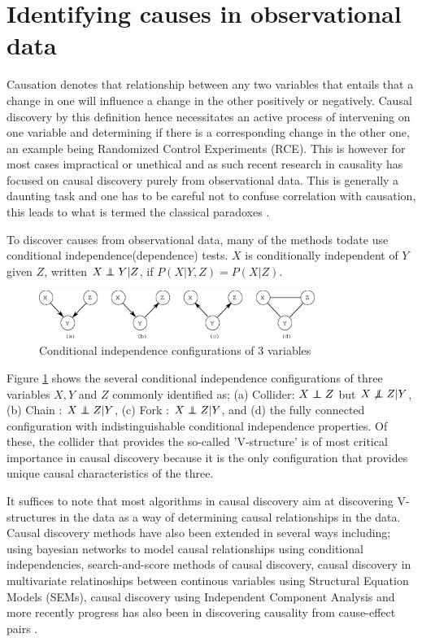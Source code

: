 \documentclass{esannV2}
\newcommand\independent{\protect\mathpalette{\protect\independenT}{\perp}}
\def\independenT#1#2{\mathrel{\rlap{$#1#2$}\mkern2mu{#1#2}}}
\def\ci{\independent}
\def\dep{\not\independent}
\begin{document}
\section{Identifying causes in observational data}
\label{sec:IdentifyingCausesInObservationalData}

Causation denotes that relationship between any two variables that entails that a change in one will influence a change in the other positively or negatively. Causal discovery by this definition hence necessitates an active process of intervening on one variable and determining if there is a corresponding change in the other one, an example being Randomized Control Experiments (RCE). This is however for most cases impractical or unethical and as such recent research in causality has focused on causal discovery purely from observational data. This is generally a daunting task and one has to be careful not to confuse correlation with causation, this leads to what is termed the classical paradoxes \cite{06}.

To discover causes from observational data, many of the methods todate use conditional independence(dependence) tests. $X$ is conditionally independent of $Y$ given $Z$, written $X \ci Y | Z$, if $P(X|Y,Z) = P(X|Z)$. 

\begin{figure}[!h]
	\centering
		\includegraphics[width=0.80\textwidth]{vstructure.eps}
	\caption{Conditional independence configurations of 3 variables}
	\label{fig:vstructure}
\end{figure}

Figure \ref{fig:vstructure} shows the several conditional independence configurations of three variables $X,Y$ and $Z$ commonly identified as; (a) Collider: $X \ci Z$ but $X \dep Z | Y$, (b) Chain : $X \ci Z | Y$, (c) Fork : $X \ci Z | Y$, and (d) the fully connected configuration with indistinguishable conditional independence properties. Of these, the collider that provides the so-called 'V-structure' is of most critical importance in causal discovery because it is the only configuration that provides unique causal characteristics of the three. 

It suffices to note that most algorithms in causal discovery aim at discovering V-structures in the data as a way of determining causal relationships in the data. Causal discovery methods have also been extended in several ways including; using bayesian networks to model causal relationships using conditional independencies, search-and-score methods of causal discovery, causal discovery in multivariate relatinoships between continous variables using Structural Equation Models (SEMs), causal discovery using Independent Component Analysis and more recently progress has also been in discovering causality from cause-effect pairs \cite{15,14}.
\end{document}
